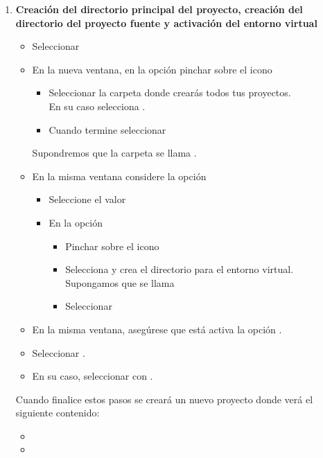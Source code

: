 \begin{enumerate}
\item \textbf{Creación del directorio principal del proyecto, creación del directorio del proyecto fuente y activación del entorno virtual} 

\begin{itemize}
\item Seleccionar 

\item En la nueva ventana, en la opción  pinchar sobre el icono \directory{\mbox{}} 
	\begin{itemize}
	\item Seleccionar la carpeta donde crearás todos tus proyectos.\\
			En su caso selecciona . 
	\item Cuando termine seleccionar  
	\end{itemize}

	Supondremos que la carpeta se llama .
	
\item En la misma ventana considere la opción  
	\begin{itemize}
	\item Seleccione el valor 
	\item En la opción  
		\begin{itemize}
		\item Pinchar sobre el icono \directory{\mbox{}}
		\item Selecciona  y crea el directorio para el entorno virtual.\\
				Supongamos que se llama 
		\item Seleccionar  
		\end{itemize}
	\end{itemize}
	
\item En la misma ventana, asegúrese que está activa la opción .
\item Seleccionar  .
\item En su caso, seleccionar  con .
\end{itemize}

Cuando finalice estos pasos se creará un nuevo proyecto donde verá el siguiente contenido:
\begin{itemize}
\item[] 
\item[] 
\end{itemize}



\end{enumerate}
